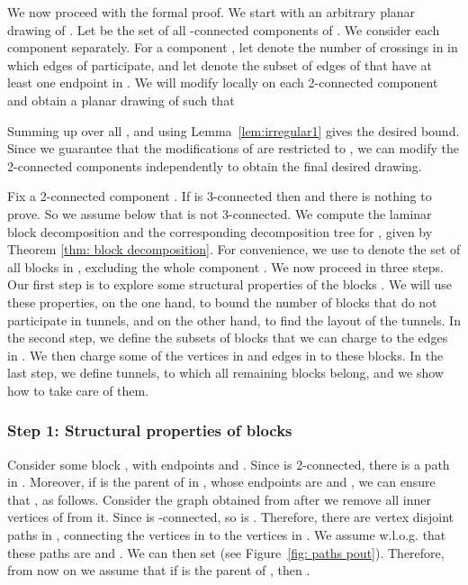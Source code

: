 \documentclass[twoside,leqno,twocolumn]{article}
\begin{document}
We now proceed with the formal proof.
We start with an arbitrary planar drawing  of . Let  be the set of all -connected components of . We consider each component  separately.
For a component ,
let  
denote the number of crossings in  in which edges of  participate, and let  denote the subset of edges of  that have at least one endpoint in .
We will modify  locally on each 2-connected component  and obtain a planar
drawing  of  such that
\ifabstract

\fi \iffull

\fi Summing up over all , and using Lemma~\ref{lem:irregular1} gives the desired bound.
Since we  guarantee that the modifications of  are restricted to ,
we can modify the 2-connected components  independently to obtain 
the final desired drawing.

Fix a 2-connected component . If  is 3-connected then 
 and there is nothing to prove. So we assume below that  is not
3-connected. We compute the laminar block decomposition  and the corresponding decomposition tree  for , given by Theorem \ref{thm: block decomposition}. For convenience, we use  to denote the set of all blocks in , excluding the whole component .
We now proceed in three steps. Our first step is to explore some structural properties of the blocks . We will use these properties, on the one hand, to bound the number of blocks that do not participate in tunnels, and on the other hand, to find the layout of the tunnels.
In the second step, we define the subsets of blocks that we can charge to the edges in . We then charge some of the vertices in  and edges in  to these blocks. In the last step, we define tunnels, to which all remaining blocks belong, and we show how to take care of them.

\subsubsection*{Step 1: Structural properties of blocks}
Consider some block , with endpoints  and . Since  is 2-connected, 
there is a path  in .
Moreover, if  is the parent of  in , whose endpoints are  and , we can ensure that , as follows. Consider the graph  obtained from  after we remove all inner vertices of  from it. Since  is -connected, so is . Therefore, there are  vertex disjoint paths in , connecting the vertices in  to the vertices in . We assume w.l.o.g. that these paths are  and . We can then set  (see Figure~\ref{fig: paths pout}). Therefore, from now on we assume that if  is the parent of , then .
\end{document}
